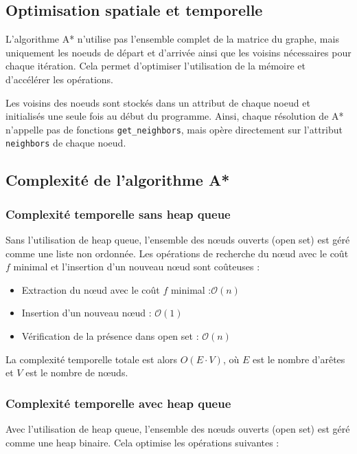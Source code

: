 \subsection{Optimisation spatiale et temporelle}
L'algorithme A* n'utilise pas l'ensemble complet de la matrice du graphe, mais uniquement les noeuds de départ et d'arrivée ainsi que les voisins nécessaires pour chaque itération. Cela permet d'optimiser l'utilisation de la mémoire et d'accélérer les opérations.

Les voisins des noeuds sont stockés dans un attribut de chaque noeud et initialisés une seule fois au début du programme. Ainsi, chaque résolution de A* n'appelle pas de fonctions \texttt{get\_neighbors}, mais opère directement sur l'attribut \texttt{neighbors} de chaque noeud.

\subsection{Complexité de l'algorithme A*}

\subsubsection*{Complexité temporelle sans heap queue}
Sans l'utilisation de heap queue, l'ensemble des nœuds ouverts (open set) est géré comme une liste non ordonnée. Les opérations de recherche du nœud avec le coût \( f \) minimal et l'insertion d'un nouveau nœud sont coûteuses :

\begin{itemize}
    \item Extraction du nœud avec le coût \( f \) minimal :$\mathcal{O}(n)$
    \item Insertion d'un nouveau nœud : $\mathcal{O}(1)$
    \item Vérification de la présence dans open set : $\mathcal{O}(n)$
\end{itemize}

La complexité temporelle totale est alors \( O(E \cdot V) \), où \( E \) est le nombre d'arêtes et \( V \) est le nombre de nœuds.

\subsubsection*{Complexité temporelle avec heap queue}
Avec l'utilisation de heap queue, l'ensemble des nœuds ouverts (open set) est géré comme une heap binaire. Cela optimise les opérations suivantes :

